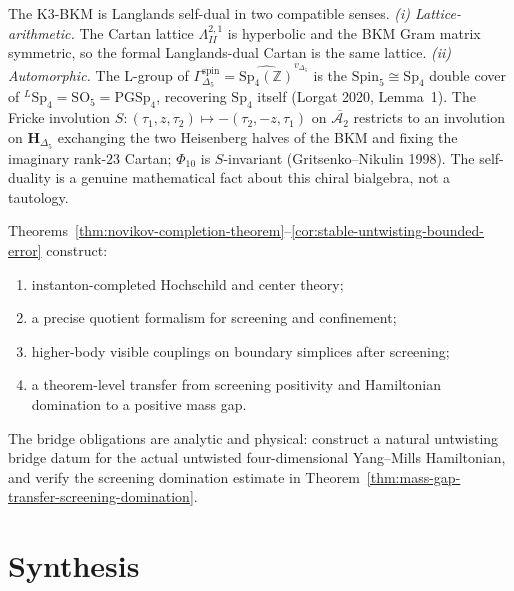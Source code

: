 \begin{remark}
\label{rem:langlands-self-duality-k3-bkm}
The K3-BKM is Langlands self-dual in two compatible senses.
\emph{(i) Lattice-arithmetic.} The Cartan lattice $\Lambda^{2,1}_{II}$
is hyperbolic and the BKM Gram matrix symmetric, so the formal
Langlands-dual Cartan is the same lattice.
\emph{(ii) Automorphic.} The L-group of
$\Gamma^{\mathrm{spin}}_{\Delta_5} =
\widehat{\mathrm{Sp}_4(\mathbb{Z})}^{v_{\Delta_5}}$ is the
$\mathrm{Spin}_5 \cong \mathrm{Sp}_4$ double cover of
${}^L\mathrm{Sp}_4 = \mathrm{SO}_5 = \mathrm{PGSp}_4$, recovering
$\mathrm{Sp}_4$ itself (Lorgat 2020, Lemma~1). The Fricke involution
$S\colon (\tau_1, z, \tau_2) \mapsto -(\tau_2, -z, \tau_1)$ on
$\overline{\mathcal{A}_2}$ restricts to an involution on
$\mathbf{H}_{\Delta_5}$ exchanging the two Heisenberg halves of the
BKM and fixing the imaginary rank-$23$ Cartan; $\Phi_{10}$ is
$S$-invariant (Gritsenko--Nikulin 1998). The self-duality is a genuine
mathematical fact about this chiral bialgebra, not a tautology.
\end{remark}

\begin{remark}
Theorems~\ref{thm:novikov-completion-theorem}--\ref{cor:stable-untwisting-bounded-error} construct:
\begin{enumerate}[label=(\roman*)]
\item instanton-completed Hochschild and center theory;
\item a precise quotient formalism for screening and confinement;
\item higher-body visible couplings on boundary simplices after screening;
\item a theorem-level transfer from screening positivity and Hamiltonian domination to a positive mass gap.
\end{enumerate}
The bridge obligations are analytic and physical: construct a natural untwisting bridge datum for the
actual untwisted four-dimensional Yang--Mills Hamiltonian, and verify the screening domination estimate in
Theorem~\ref{thm:mass-gap-transfer-screening-domination}.
\end{remark}

\section{Synthesis}
\label{sec:yms-supplement}

